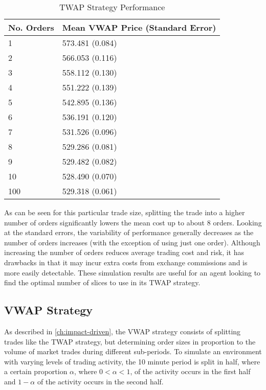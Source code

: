 \begin{table}[htbp]
\begin{center}
\caption{TWAP Strategy Performance} \label{tab:twap_strategy}
\begin{tabular}{l|l}
\hline \hline
\textbf{No. Orders} & \textbf{Mean VWAP Price (Standard Error)} \\
\hline
1                & 573.481 (0.084)            \\
2                & 566.053 (0.116)            \\
3                & 558.112 (0.130)            \\
4                & 551.222 (0.139)            \\
5                & 542.895 (0.136)            \\
6                & 536.191 (0.120)            \\
7                & 531.526 (0.096)            \\
8                & 529.286 (0.081)            \\
9                & 529.482 (0.082)            \\
10               & 528.490 (0.070)            \\
100              & 529.318 (0.061)           
\end{tabular}
\end{center}
\end{table}

As can be seen for this particular trade size, splitting the trade into a higher number of orders significantly lowers the mean cost up to about 8 orders. Looking at the standard errors, the variability of performance generally decreases as the number of orders increases (with the exception of using just one order). Although increasing the number of orders reduces average trading cost and risk, it has drawbacks in that it may incur extra costs from exchange commissions and is more easily detectable. These simulation results are useful for an agent looking to find the optimal number of slices to use in its TWAP strategy. 

\subsection{VWAP Strategy}
As described in \ref{ch:impact-driven}, the VWAP strategy consists of splitting trades like the TWAP strategy, but determining order sizes in proportion to the volume of market trades during different sub-periods. To simulate an environment with varying levels of trading activity, the 10 minute period is split in half, where a certain proportion $\alpha$, where $0 < \alpha < 1$, of the activity occurs in the first half and $1-\alpha$ of the activity occurs in the second half. 

